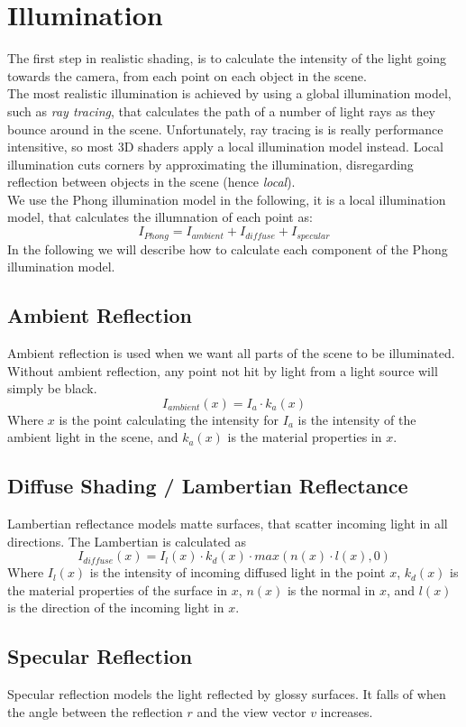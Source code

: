 \documentclass[a4paper,11pt]{article}
\begin{document}
\section{Illumination}
The first step in realistic shading, is to calculate the intensity of the light going towards the camera, from each point on each object in the scene.\\

The most realistic illumination is achieved by using a global illumination model, such as \emph{ray tracing}, that calculates the path of a number of light rays as they bounce around in the scene. Unfortunately, ray tracing is is really performance intensitive, so most 3D shaders apply a local illumination model instead. Local illumination cuts corners by approximating the illumination, disregarding reflection between objects in the scene (hence \emph{local}).\\

We use the Phong illumination model in the following, it is a local illumination model, that calculates the illumnation of each point as:
\[I_{Phong} = I_{ambient} + I_{diffuse} + I_{specular}\]
In the following we will describe how to calculate each component of the Phong illumination model.
\subsection{Ambient Reflection}
Ambient reflection is used when we want all parts of the scene to be illuminated. Without ambient reflection, any point not hit by light from a light source will simply be black.
\[I_{ambient}(x) = I_a \cdot k_a(x)\]
Where $x$ is the point calculating the intensity for $I_a$ is the intensity of the ambient light in the scene, and $k_a(x)$ is the material properties in $x$.

\subsection{Diffuse Shading / Lambertian Reflectance}
Lambertian reflectance models matte surfaces, that scatter incoming light in all directions.
The Lambertian is calculated as
\[I_{diffuse}(x)=I_l(x) \cdot k_d(x) \cdot max(n(x) \cdot l(x), 0)\]
Where $I_l(x)$ is the intensity of incoming diffused light in the point $x$, $k_d(x)$ is the material properties of the surface in $x$, $n(x)$ is the normal in $x$, and $l(x)$ is the direction of the incoming light in $x$.
\subsection{Specular Reflection}
Specular reflection models the light reflected by glossy surfaces. It falls of when the angle between the reflection $r$ and the view vector $v$ increases.
\end{document}
